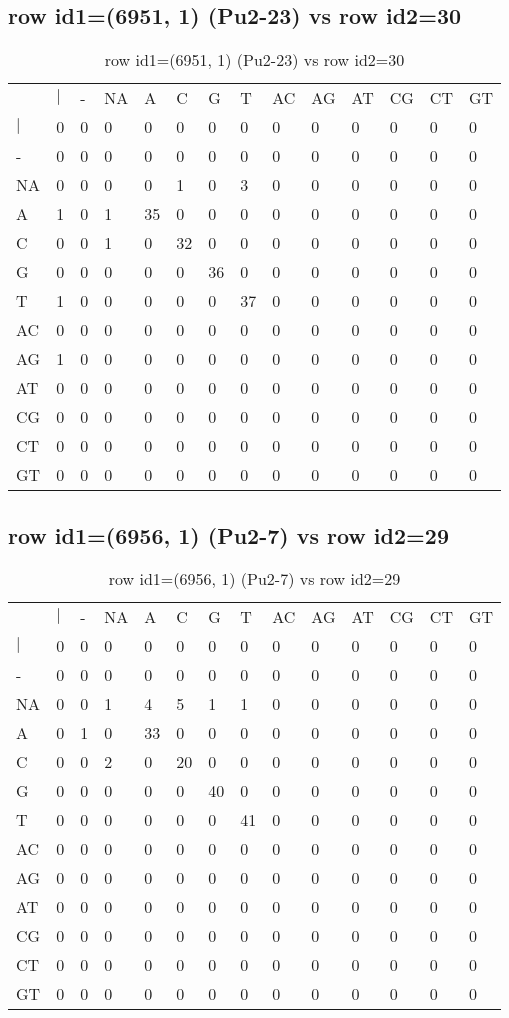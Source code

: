 \subsection{row id1=(6951, 1) (Pu2-23) vs row id2=30}
\begin{center}
\begin{longtable}{|l|l|l|l|l|l|l|l|l|l|l|l|l|l|}
\caption{row id1=(6951, 1) (Pu2-23) vs row id2=30} \label{table_dm160}\\
\hline
\\
\hline
&$|$&-&NA&A&C&G&T&AC&AG&AT&CG&CT&GT\\
$|$&0&0&0&0&0&0&0&0&0&0&0&0&0\\
-&0&0&0&0&0&0&0&0&0&0&0&0&0\\
NA&0&0&0&0&1&0&3&0&0&0&0&0&0\\
A&1&0&1&35&0&0&0&0&0&0&0&0&0\\
C&0&0&1&0&32&0&0&0&0&0&0&0&0\\
G&0&0&0&0&0&36&0&0&0&0&0&0&0\\
T&1&0&0&0&0&0&37&0&0&0&0&0&0\\
AC&0&0&0&0&0&0&0&0&0&0&0&0&0\\
AG&1&0&0&0&0&0&0&0&0&0&0&0&0\\
AT&0&0&0&0&0&0&0&0&0&0&0&0&0\\
CG&0&0&0&0&0&0&0&0&0&0&0&0&0\\
CT&0&0&0&0&0&0&0&0&0&0&0&0&0\\
GT&0&0&0&0&0&0&0&0&0&0&0&0&0\\
\hline
\end{longtable}
\end{center}

\subsection{row id1=(6956, 1) (Pu2-7) vs row id2=29}
\begin{center}
\begin{longtable}{|l|l|l|l|l|l|l|l|l|l|l|l|l|l|}
\caption{row id1=(6956, 1) (Pu2-7) vs row id2=29} \label{table_dm162}\\
\hline
\\
\hline
&$|$&-&NA&A&C&G&T&AC&AG&AT&CG&CT&GT\\
$|$&0&0&0&0&0&0&0&0&0&0&0&0&0\\
-&0&0&0&0&0&0&0&0&0&0&0&0&0\\
NA&0&0&1&4&5&1&1&0&0&0&0&0&0\\
A&0&1&0&33&0&0&0&0&0&0&0&0&0\\
C&0&0&2&0&20&0&0&0&0&0&0&0&0\\
G&0&0&0&0&0&40&0&0&0&0&0&0&0\\
T&0&0&0&0&0&0&41&0&0&0&0&0&0\\
AC&0&0&0&0&0&0&0&0&0&0&0&0&0\\
AG&0&0&0&0&0&0&0&0&0&0&0&0&0\\
AT&0&0&0&0&0&0&0&0&0&0&0&0&0\\
CG&0&0&0&0&0&0&0&0&0&0&0&0&0\\
CT&0&0&0&0&0&0&0&0&0&0&0&0&0\\
GT&0&0&0&0&0&0&0&0&0&0&0&0&0\\
\hline
\end{longtable}
\end{center}

